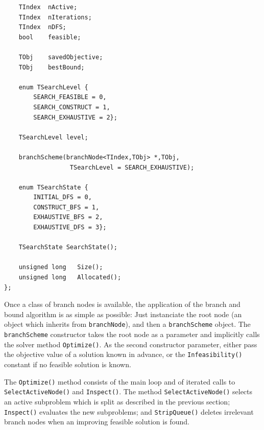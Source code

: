 \documentclass[a4paper,11pt,twoside]{book}
\begin{document}
\begin{multicols}{2}
\begin{mymethods}
\begin{verbatim}
    TIndex  nActive;
    TIndex  nIterations;
    TIndex  nDFS;
    bool    feasible;

    TObj    savedObjective;
    TObj    bestBound;

    enum TSearchLevel {
        SEARCH_FEASIBLE = 0,
        SEARCH_CONSTRUCT = 1,
        SEARCH_EXHAUSTIVE = 2};

    TSearchLevel level;

    branchScheme(branchNode<TIndex,TObj> *,TObj,
                  TSearchLevel = SEARCH_EXHAUSTIVE);

    enum TSearchState {
        INITIAL_DFS = 0,
        CONSTRUCT_BFS = 1,
        EXHAUSTIVE_BFS = 2,
        EXHAUSTIVE_DFS = 3};

    TSearchState SearchState();

    unsigned long   Size();
    unsigned long   Allocated();
};
\end{verbatim}
\end{mymethods}
Once a class of branch nodes is available, the application of the branch and
bound algorithm is as simple as possible: Just instanciate the root node (an
object which inherits from \verb/branchNode/), and then a \verb/branchScheme/
object. The \verb/branchScheme/ constructor takes the root node as a parameter
and implicitly calls the solver method \verb/Optimize()/. As the second
constructor parameter, either pass the objective value of a solution known in
advance, or the \verb/Infeasibility()/ constant if no feasible solution is
known.

The \verb/Optimize()/ method consists of the main loop and of iterated calls to
\verb/SelectActiveNode()/ and \verb/Inspect()/. The method
\verb/SelectActiveNode()/ selects an active subproblem which is split as
described in the previous section; \verb/Inspect()/ evaluates the new
subproblems; and \verb/StripQueue()/ deletes irrelevant branch nodes when an
improving feasible solution is found.


\end{multicols}
\end{document}
